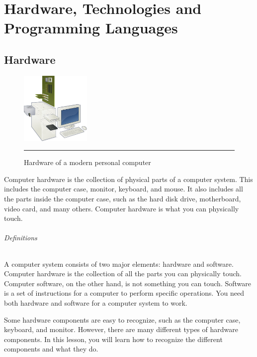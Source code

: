 
\chapter{Hardware, Technologies and Programming Languages} %

\label{Chapter2} %



\section{Hardware}
\begin{figure}
  \begin{center}
    \includegraphics[width=0.3\textwidth]{./Pictures/hardware.jpg}
  \end{center}
  \rule{0.3\textwidth}{0.5pt}
  \caption{Hardware of a modern personal computer}
  \label{fig:hardware}
\end{figure}

Computer hardware is the collection of physical parts of a computer system. This includes the computer case, monitor, keyboard, and mouse. It also includes all the parts inside the computer case, such as the hard disk drive, motherboard, video card, and many others. Computer hardware is what you can physically touch.
\subparagraph*{Definitions}
\hfill \break
A computer system consists of two major elements: hardware and software. Computer hardware is the collection of all the parts you can physically touch. Computer software, on the other hand, is not something you can touch. Software is a set of instructions for a computer to perform specific operations. You need both hardware and software for a computer system to work.

Some hardware components are easy to recognize, such as the computer case, keyboard, and monitor. However, there are many different types of hardware components. In this lesson, you will learn how to recognize the different components and what they do.

